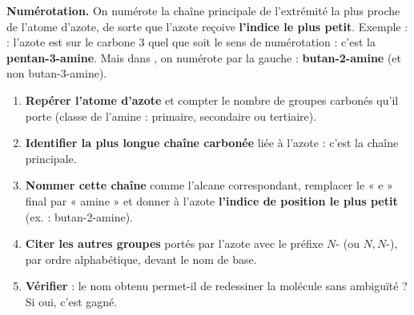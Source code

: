 \documentclass[11pt]{article}
\begin{document}
\textbf{Numérotation.} On numérote la chaîne principale de l'extrémité la plus proche de l'atome d'azote, de sorte que l'azote reçoive \textbf{l'indice le plus petit}. Exemple :  : l'azote est sur le carbone 3 quel que soit le sens de numérotation : c'est la \textbf{pentan-3-amine}. Mais dans , on numérote par la gauche : \textbf{butan-2-amine} (et non butan-3-amine).

\begin{methode}
\begin{enumerate}
\item \textbf{Repérer l'atome d'azote} et compter le nombre de groupes carbonés qu'il porte (classe de l'amine : primaire, secondaire ou tertiaire).
\item \textbf{Identifier la plus longue chaîne carbonée} liée à l'azote : c'est la chaîne principale.
\item \textbf{Nommer cette chaîne} comme l'alcane correspondant, remplacer le « e » final par « amine » et donner à l'azote \textbf{l'indice de position le plus petit} (ex. : butan-2-amine).
\item \textbf{Citer les autres groupes} portés par l'azote avec le préfixe $N$- (ou $N,N$-), par ordre alphabétique, devant le nom de base.
\item \textbf{Vérifier} : le nom obtenu permet-il de redessiner la molécule sans ambiguïté ? Si oui, c'est gagné.
\end{enumerate}
\end{methode}
\end{document}
